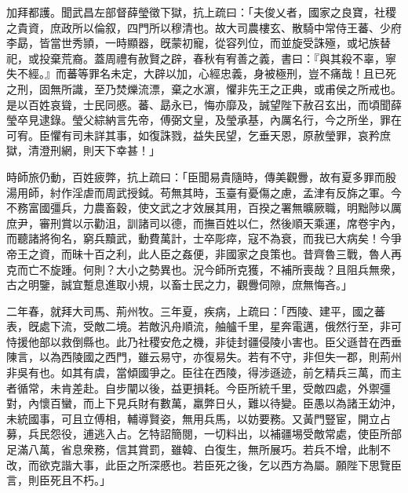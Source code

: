 \begin{pinyinscope}
加拜都護。聞武昌左部督薛瑩徵下獄，抗上疏曰：「夫俊乂者，國家之良寶，社稷之貴資，庶政所以倫叙，四門所以穆清也。故大司農樓玄、散騎中常侍王蕃、少府李勗，皆當世秀頴，一時顯器，旣蒙初寵，從容列位，而並旋受誅殛，或圮族替祀，或投棄荒裔。蓋周禮有赦賢之辟，春秋有宥善之義，書曰：『與其殺不辜，寧失不經。』而蕃等罪名未定，大辟以加，心經忠義，身被極刑，豈不痛哉！且已死之刑，固無所識，至乃焚爍流漂，棄之水濵，懼非先王之正典，或甫侯之所戒也。是以百姓哀聳，士民同慼。蕃、勗永已，悔亦靡及，誠望陛下赦召玄出，而頃聞薛瑩卒見逮錄。瑩父綜納言先帝，傅弼文皇，及瑩承基，內厲名行，今之所坐，罪在可宥。臣懼有司未詳其事，如復誅戮，益失民望，乞垂天恩，原赦瑩罪，哀矜庶獄，清澄刑網，則天下幸甚！」

時師旅仍動，百姓疲弊，抗上疏曰：「臣聞易貴隨時，傳美觀釁，故有夏多罪而殷湯用師，紂作淫虐而周武授鉞。苟無其時，玉臺有憂傷之慮，孟津有反旆之軍。今不務富國彊兵，力農畜穀，使文武之才效展其用，百揆之署無曠厥職，明黜陟以厲庶尹，審刑賞以示勸沮，訓諸司以德，而撫百姓以仁，然後順天乘運，席卷宇內，而聽諸將徇名，窮兵黷武，動費萬計，士卒彫瘁，寇不為衰，而我已大病矣！今爭帝王之資，而昧十百之利，此人臣之姦便，非國家之良策也。昔齊魯三戰，魯人再克而亡不旋踵。何則？大小之勢異也。況今師所克獲，不補所喪哉？且阻兵無衆，古之明鑒，誠宜蹔息進取小規，以畜士民之力，觀釁伺隙，庶無悔吝。」

二年春，就拜大司馬、荊州牧。三年夏，疾病，上疏曰：「西陵、建平，國之蕃表，旣處下流，受敵二境。若敵汎舟順流，舳艫千里，星奔電邁，俄然行至，非可恃援他部以救倒縣也。此乃社稷安危之機，非徒封疆侵陵小害也。臣父遜昔在西垂陳言，以為西陵國之西門，雖云易守，亦復易失。若有不守，非但失一郡，則荊州非吳有也。如其有虞，當傾國爭之。臣往在西陵，得涉遜迹，前乞精兵三萬，而主者循常，未肯差赴。自步闡以後，益更損耗。今臣所統千里，受敵四處，外禦彊對，內懷百蠻，而上下見兵財有數萬，羸弊日乆，難以待變。臣愚以為諸王幼沖，未統國事，可且立傅相，輔導賢姿，無用兵馬，以妨要務。又黃門豎宦，開立占募，兵民怨役，逋逃入占。乞特詔簡閱，一切料出，以補疆埸受敵常處，使臣所部足滿八萬，省息衆務，信其賞罰，雖韓、白復生，無所展巧。若兵不增，此制不改，而欲克諧大事，此臣之所深慼也。若臣死之後，乞以西方為屬。願陛下思覽臣言，則臣死且不朽。」


\end{pinyinscope}
